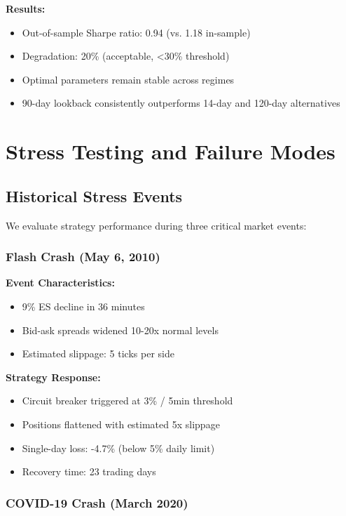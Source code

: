 \documentclass[twocolumn,ieee]{arithmaxresearch}
\begin{document}
\textbf{Results:}
\begin{itemize}
    \item Out-of-sample Sharpe ratio: 0.94 (vs. 1.18 in-sample)
    \item Degradation: 20\% (acceptable, <30\% threshold)
    \item Optimal parameters remain stable across regimes
    \item 90-day lookback consistently outperforms 14-day and 120-day alternatives
\end{itemize}

\section{Stress Testing and Failure Modes}

\subsection{Historical Stress Events}

We evaluate strategy performance during three critical market events:

\subsubsection{Flash Crash (May 6, 2010)}

\textbf{Event Characteristics:}
\begin{itemize}
    \item 9\% ES decline in 36 minutes
    \item Bid-ask spreads widened 10-20x normal levels
    \item Estimated slippage: 5 ticks per side
\end{itemize}

\textbf{Strategy Response:}
\begin{itemize}
    \item Circuit breaker triggered at 3\% / 5min threshold
    \item Positions flattened with estimated 5x slippage
    \item Single-day loss: -4.7\% (below 5\% daily limit)
    \item Recovery time: 23 trading days
\end{itemize}

\subsubsection{COVID-19 Crash (March 2020)}
\end{document}
